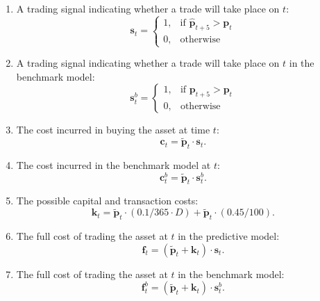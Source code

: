 \documentclass[a4paper,11pt,oneside]{article}
\theoremstyle{plain}
\theoremstyle{definition}
\begin{document}
	\begin{enumerate}
		\item A trading signal indicating whether a trade will take place on $t$:
		\begin{equation}\end{equation}
			\[\mathbf{s}_t= 
				\begin{cases}
				1,& \text{if } \mathbf{\hat{p}}_{t+5} > \mathbf{p}_t\\
				0,              & \text{otherwise}
				\end{cases}
				\]

		\item A trading signal indicating whether a trade will take place on $t$ in the benchmark model:
				\begin{equation}\end{equation}
				\[\mathbf{s}^b_t= 
				\begin{cases}
				1,& \text{if } \mathbf{{p}}_{t+5} > \mathbf{p}_t\\
				0,              & \text{otherwise}
				\end{cases}
				\]
		
		\item The cost incurred in buying the asset at time $t$:
		\begin{equation}
			\mathbf{c}_t = \mathbf{\tilde{p}}_t \cdot \mathbf{s}_t .
		\end{equation}
		\item The cost incurred in the benchmark model at $t$:
		\begin{equation}
				\mathbf{c}^b_{t} = \mathbf{\tilde{p}}_t \cdot \mathbf{s}^b_{t} .
		\end{equation}
		\item The possible capital and transaction costs:
		\begin{equation}\label{eq_capital_costs}
			\mathbf{k}_t= \mathbf{\tilde{p}}_t \cdot (0.1 / 365 \cdot D) + \mathbf{\tilde{p}}_t \cdot (0.45 / 100) .
		\end{equation}
		\item The full cost of trading the asset at $t$ in the predictive model:
		\begin{equation}
			\mathbf{f}_t = (\mathbf{\tilde{p}}_t + \mathbf{k}_t) \cdot \mathbf{s}_t .
		\end{equation}	
		\item The full cost of trading the asset at $t$ in the benchmark model:
		\begin{equation}
			\mathbf{f}^b_{t} = (\mathbf{\tilde{p}}_t + \mathbf{k}_t) \cdot \mathbf{s}^b_{t} .
		\end{equation}
		

\end{enumerate}
\end{document}
